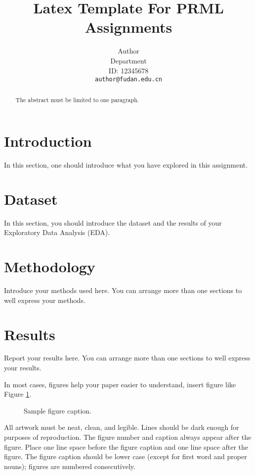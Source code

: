 \documentclass{article}
\title{Latex Template For PRML Assignments %
}
\author{%
  Author \\ %
  Department \\ %
  ID: 12345678 \\
  \texttt{author@fudan.edu.cn} \\
}
\begin{document}
\maketitle

\begin{abstract}
   The abstract must be limited to one paragraph.
\end{abstract}

\section{Introduction}
In this section, one should introduce what you have explored in this assignment.

\section{Dataset}
In this section, you should introduce the dataset \cite{DBLP:journals/corr/abs-1708-07747} and the results of your Exploratory Data Analysis (EDA).


\section{Methodology}
Introduce your methods used here.
You can arrange more than one sections to well express your methods.

\section{Results}
Report your results here.
You can arrange more than one sections to well express your results.


In most cases, figures help your paper easier to understand, insert figure like Figure \ref{fig1:example}.
\begin{figure}[H]
  \centering
  \fbox{\rule[-.5cm]{0cm}{4cm} \rule[-.5cm]{4cm}{0cm}}
   \caption{Sample figure caption.}
  \label{fig1:example} 
\end{figure}

All artwork must be neat, clean, and legible. Lines should be dark enough for
purposes of reproduction. The figure number and caption always appear after the
figure. Place one line space before the figure caption and one line space after
the figure. The figure caption should be lower case (except for first word and
proper nouns); figures are numbered consecutively.
\end{document}
